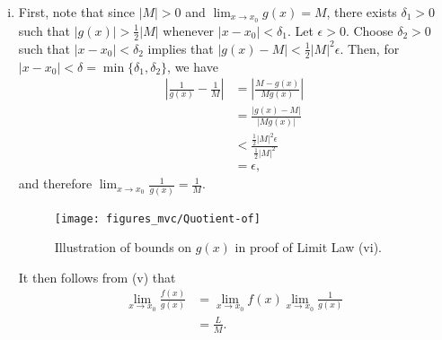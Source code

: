 \documentclass[12pt,letterpaper,reqno]{article}
\numberwithin{equation}{section}
\begin{document}
{\begin{pf}
\begin{enumerate}[(i)]
\begin{align*}
			|(f(x)-L)(g(x)-M)|=|f(x)-L||g(x)-M|<(\sqrt{\epsilon})^2=\epsilon
		\end{align*}
		which shows that $\lim_{x-x_0}(f(x)-L)(g(x)-M)=0$. By (iii), 
		\begin{align*}
			\lim_{x \to x_0}L(g(x)-M)=L\lim_{x \to x_0}(g(x)-M)=L\cdot0=0,
		\end{align*}
		 and 
		\begin{align*}
			\lim_{x \to x_0}M(f(x)-L)=M\lim_{x \to x_0}(f(x)-L)=M\cdot0=0.
		\end{align*}
		Applying (iv),
		\begin{align*}
			\lim_{x \to x_0}(f(x)g(x)-LM)&=\lim_{x \to x_0}(f(x)-L)(g(x)-M)+\lim_{x \to x_0}L(g(x)-M)+\lim_{x \to x_0}M(f(x)-L) \\
			&=0+0+0 \\
			&=0,
		\end{align*}
		and therefore
		\begin{align*}
			\lim_{x \to x_0}f(x)g(x)=LM.
		\end{align*}
	\item First, note that since $|M|>0$ and $\lim_{x \to x_0}g(x)=M$, there exists $\delta_1>0$ such that $|g(x)|>\frac{1}{2}|M|$ whenever $|x-x_0|<\delta_1$. Let $\epsilon>0$. Choose $\delta_2>0$ such that $|x-x_0|<\delta_2$ implies that $|g(x)-M|<\frac{1}{2}|M|^2\epsilon$. Then, for $|x-x_0|<\delta = \min\{\delta_1,\delta_2\}$, we have
	\begin{align*}
		|\frac{1}{g(x)}-\frac{1}{M}|&=|\frac{M-g(x)}{Mg(x)}|\\
		&=\frac{|g(x)-M|}{|Mg(x)|} \\
		&<\frac{\frac{1}{2}|M|^2\epsilon}{\frac{1}{2}|M|^2} \\
		&=\epsilon,	
	\end{align*}
	and therefore $\lim_{x \to x_0}\frac{1}{g(x)}=\frac{1}{M}$. 
	\begin{figure}[h]
	\begin{center}
		\texttt{[image: figures\_mvc/Quotient-of]}
	\end{center}
	\caption{Illustration of bounds on $g(x)$ in proof of Limit Law (vi).}		
	\end{figure}
	\newpage 
	It then follows from (v) that
	\begin{align*}
		\lim_{x \to x_0}\frac{f(x)}{g(x)}&=\lim_{x \to x_0}f(x) \lim_{x \to x_0}\frac{1}{g(x)} \\
		&=\frac{L}{M}.
	\end{align*}
\end{enumerate}	
\end{pf}

}
\end{document}
